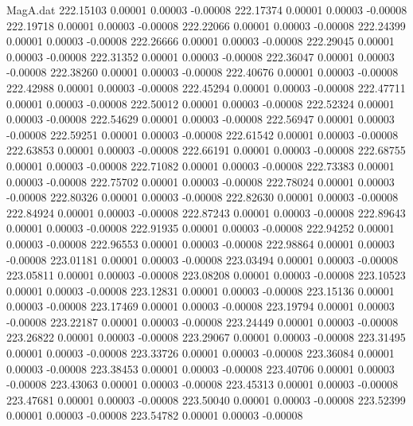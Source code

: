 \begin{filecontents}{MagA.dat}
 222.15103    0.00001    0.00003   -0.00008
 222.17374    0.00001    0.00003   -0.00008
 222.19718    0.00001    0.00003   -0.00008
 222.22066    0.00001    0.00003   -0.00008
 222.24399    0.00001    0.00003   -0.00008
 222.26666    0.00001    0.00003   -0.00008
 222.29045    0.00001    0.00003   -0.00008
 222.31352    0.00001    0.00003   -0.00008
 222.36047    0.00001    0.00003   -0.00008
 222.38260    0.00001    0.00003   -0.00008
 222.40676    0.00001    0.00003   -0.00008
 222.42988    0.00001    0.00003   -0.00008
 222.45294    0.00001    0.00003   -0.00008
 222.47711    0.00001    0.00003   -0.00008
 222.50012    0.00001    0.00003   -0.00008
 222.52324    0.00001    0.00003   -0.00008
 222.54629    0.00001    0.00003   -0.00008
 222.56947    0.00001    0.00003   -0.00008
 222.59251    0.00001    0.00003   -0.00008
 222.61542    0.00001    0.00003   -0.00008
 222.63853    0.00001    0.00003   -0.00008
 222.66191    0.00001    0.00003   -0.00008
 222.68755    0.00001    0.00003   -0.00008
 222.71082    0.00001    0.00003   -0.00008
 222.73383    0.00001    0.00003   -0.00008
 222.75702    0.00001    0.00003   -0.00008
 222.78024    0.00001    0.00003   -0.00008
 222.80326    0.00001    0.00003   -0.00008
 222.82630    0.00001    0.00003   -0.00008
 222.84924    0.00001    0.00003   -0.00008
 222.87243    0.00001    0.00003   -0.00008
 222.89643    0.00001    0.00003   -0.00008
 222.91935    0.00001    0.00003   -0.00008
 222.94252    0.00001    0.00003   -0.00008
 222.96553    0.00001    0.00003   -0.00008
 222.98864    0.00001    0.00003   -0.00008
 223.01181    0.00001    0.00003   -0.00008
 223.03494    0.00001    0.00003   -0.00008
 223.05811    0.00001    0.00003   -0.00008
 223.08208    0.00001    0.00003   -0.00008
 223.10523    0.00001    0.00003   -0.00008
 223.12831    0.00001    0.00003   -0.00008
 223.15136    0.00001    0.00003   -0.00008
 223.17469    0.00001    0.00003   -0.00008
 223.19794    0.00001    0.00003   -0.00008
 223.22187    0.00001    0.00003   -0.00008
 223.24449    0.00001    0.00003   -0.00008
 223.26822    0.00001    0.00003   -0.00008
 223.29067    0.00001    0.00003   -0.00008
 223.31495    0.00001    0.00003   -0.00008
 223.33726    0.00001    0.00003   -0.00008
 223.36084    0.00001    0.00003   -0.00008
 223.38453    0.00001    0.00003   -0.00008
 223.40706    0.00001    0.00003   -0.00008
 223.43063    0.00001    0.00003   -0.00008
 223.45313    0.00001    0.00003   -0.00008
 223.47681    0.00001    0.00003   -0.00008
 223.50040    0.00001    0.00003   -0.00008
 223.52399    0.00001    0.00003   -0.00008
 223.54782    0.00001    0.00003   -0.00008

\end{filecontents}
